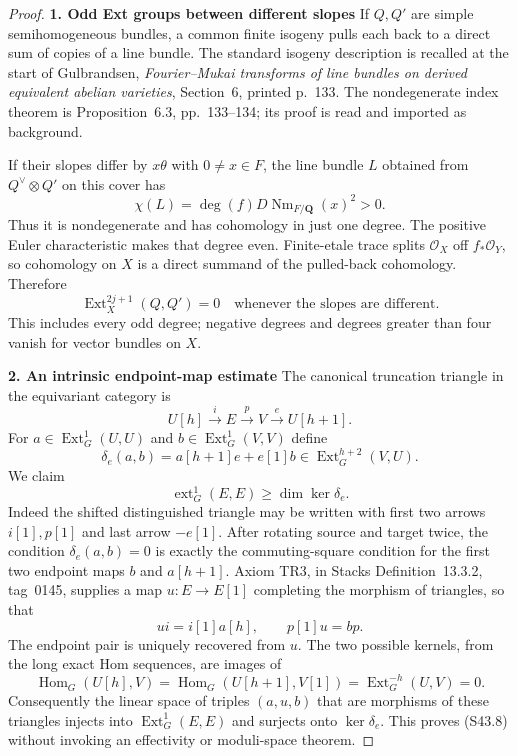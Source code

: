 \begin{proof}
\par\medskip\noindent\textbf{1. Odd Ext groups between different slopes}\quad
If $Q,Q'$ are simple semihomogeneous bundles, a common finite
isogeny pulls each back to a direct sum of copies of a line
bundle. The standard isogeny description is recalled at the
start of Gulbrandsen, \emph{Fourier--Mukai transforms of line
bundles on derived equivalent abelian varieties}, Section~6,
printed p.~133. The nondegenerate index theorem is Proposition~6.3,
pp.~133--134; its proof is read and imported as background.

If their slopes differ by $x\theta$ with $0\ne x\in F$, the
line bundle $L$ obtained from $Q^\vee\otimes Q'$ on this cover
has
\[
 \chi(L)=\deg(f)D\operatorname{Nm}_{F/\mathbf Q}(x)^2>0.
\]
Thus it is nondegenerate and has cohomology in just one degree.
The positive Euler characteristic makes that degree even.
Finite-etale trace splits $\mathcal O_X$ off $f_*\mathcal O_Y$,
so cohomology on $X$ is a direct summand of the pulled-back
cohomology. Therefore
\[
 \operatorname{Ext}^{2j+1}_X(Q,Q')=0
 \quad\text{whenever the slopes are different}.
 \tag{S43.5}
\]
This includes every odd degree; negative degrees and degrees
greater than four vanish for vector bundles on $X$.

\par\medskip\noindent\textbf{2. An intrinsic endpoint-map estimate}\quad
The canonical truncation triangle in the equivariant category is
\[
 U[h]\xrightarrow{i}E\xrightarrow{p}V
                  \xrightarrow{e}U[h+1].
 \tag{S43.6}
\]
For $a\in\operatorname{Ext}^1_G(U,U)$ and
$b\in\operatorname{Ext}^1_G(V,V)$ define
\[
 \delta_e(a,b)=a[h+1]e+e[1]b
       \in\operatorname{Ext}^{h+2}_G(V,U).
 \tag{S43.7}
\]
We claim
\[
 \operatorname{ext}^1_G(E,E)\ge\dim\ker\delta_e.
 \tag{S43.8}
\]
Indeed the shifted distinguished triangle may be written with
first two arrows $i[1],p[1]$ and last arrow $-e[1]$.
After rotating source and target twice, the condition
$\delta_e(a,b)=0$ is exactly the commuting-square condition
for the first two endpoint maps $b$ and $a[h+1]$.
Axiom TR3, in Stacks Definition~13.3.2, tag~0145, supplies a map
$u:E\to E[1]$ completing the morphism of triangles, so that
\[
 ui=i[1]a[h],\qquad p[1]u=bp.
 \tag{S43.9}
\]
The endpoint pair is uniquely recovered from $u$. The two
possible kernels, from the long exact Hom sequences, are
images of
\[
 \operatorname{Hom}_G(U[h],V)
 =\operatorname{Hom}_G(U[h+1],V[1])
 =\operatorname{Ext}^{-h}_G(U,V)=0.
\]
Consequently the linear space of triples $(a,u,b)$ that are
morphisms of these triangles injects into
$\operatorname{Ext}^1_G(E,E)$ and surjects onto
$\ker\delta_e$. This proves (S43.8) without invoking an
effectivity or moduli-space theorem.


\end{proof}
